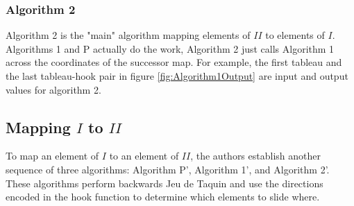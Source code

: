 \documentclass[11pt]{article}
\theoremstyle{definition}
\begin{document}
\subsubsection{Algorithm 2}
Algorithm 2 is the "main" algorithm mapping elements of $II$ to elements of $I$. Algorithms 1 and P actually do the work, Algorithm 2 just calls Algorithm 1 across the coordinates of the successor map. For example, the first tableau and the last tableau-hook pair in figure \ref{fig:Algorithm1Output} are input and output values for algorithm 2.\\

\begin{algorithm}[H]
\SetAlgoLongEnd
\end{algorithm}
\subsection{Mapping $I$ to $II$}
To map an element of $I$ to an element of $II$, the authors establish another sequence of three algorithms: Algorithm P', Algorithm 1', and Algorithm 2'. These algorithms perform backwards Jeu de Taquin and use the directions encoded in the hook function to determine which elements to slide where.
\end{document}
